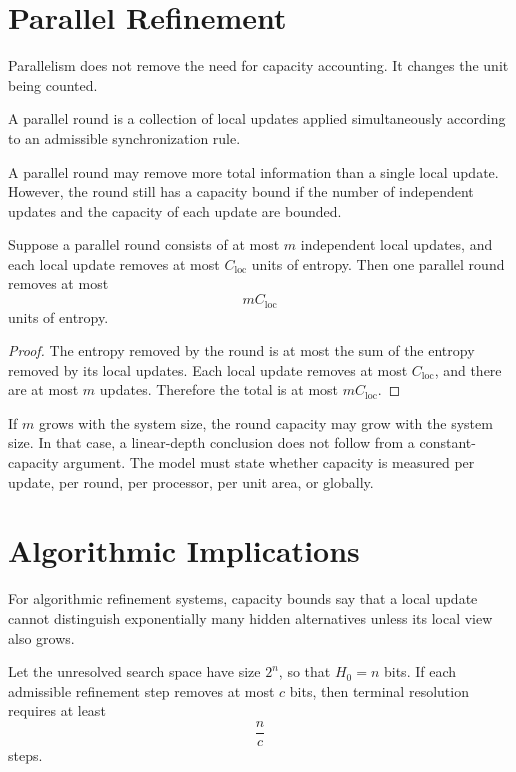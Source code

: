 \section{Parallel Refinement}

Parallelism does not remove the need for capacity accounting. It changes the
unit being counted.

\begin{definition}
A parallel round is a collection of local updates applied simultaneously
according to an admissible synchronization rule.
\end{definition}

A parallel round may remove more total information than a single local update.
However, the round still has a capacity bound if the number of independent
updates and the capacity of each update are bounded.

\begin{theorem}
Suppose a parallel round consists of at most \(m\) independent local updates,
and each local update removes at most \(C_{\mathrm{loc}}\) units of entropy.
Then one parallel round removes at most
\[
mC_{\mathrm{loc}}
\]
units of entropy.
\end{theorem}

\begin{proof}
The entropy removed by the round is at most the sum of the entropy removed by
its local updates. Each local update removes at most \(C_{\mathrm{loc}}\), and
there are at most \(m\) updates. Therefore the total is at most
\(mC_{\mathrm{loc}}\).
\end{proof}

If \(m\) grows with the system size, the round capacity may grow with the
system size. In that case, a linear-depth conclusion does not follow from a
constant-capacity argument. The model must state whether capacity is measured
per update, per round, per processor, per unit area, or globally.

\section{Algorithmic Implications}

For algorithmic refinement systems, capacity bounds say that a local update
cannot distinguish exponentially many hidden alternatives unless its local
view also grows.

\begin{example}
Let the unresolved search space have size \(2^n\), so that \(H_0=n\) bits. If
each admissible refinement step removes at most \(c\) bits, then terminal
resolution requires at least
\[
\frac{n}{c}
\]
steps.
\end{example}


